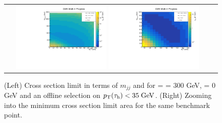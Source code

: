 \begin{figure}[tbh!]
	\centering
	\begin{tabular}{cc}
		\includegraphics[width=0.45\textwidth]{analysis/pics/JetInvMass_vs_MET_xsec_chi300_lsp000_taupt35.pdf}
		\includegraphics[width=0.45\textwidth]{analysis/pics/JetInvMass_vs_MET_xsec_chi300_lsp000_taupt35_zoom.pdf} 		
	\end{tabular}
	\caption{(Left) Cross section limit in terms of $m_{jj}$ and \met for \charginopm = \neutralinotwo = 300 GeV, \neutralinoone = 0 GeV and an offline selection on $p_{\text{T}}(\tau_{\text{h}}) <  35\;\text{Ge}\kern-0.06667em\text{V}$. (Right) Zooming into the minimum cross section limit area for the same benchmark point.}
	\label{fig::JetInvMass_vs_MET_xsec_chi300_lsp000_taupt35}
\end{figure}

